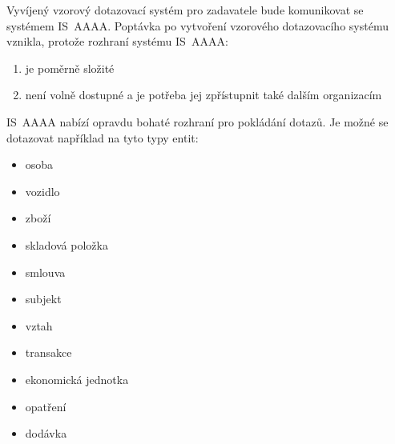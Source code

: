 \documentclass[thesis=M,czech]{FITthesis}[2019/12/23]
\begin{document}
\newpage
Vyvíjený vzorový dotazovací systém pro zadavatele bude komunikovat se systémem IS~AAAA. Poptávka po vytvoření vzorového dotazovacího systému vznikla, protože rozhraní systému IS~AAAA:
\begin{enumerate}
	\item je poměrně složité
	\item není volně dostupné a je potřeba jej zpřístupnit také dalším organizacím
\end{enumerate}

IS~AAAA nabízí opravdu bohaté rozhraní pro pokládání dotazů. Je možné se dotazovat například na tyto typy entit: \cite{Queries}
\begin{itemize}
	\item osoba
	\item vozidlo
	\item zboží
	\item skladová položka
	\item smlouva
	\item subjekt
	\item vztah
	\item transakce
	\item ekonomická jednotka
	\item opatření
	\item dodávka
\end{itemize}
\end{document}
